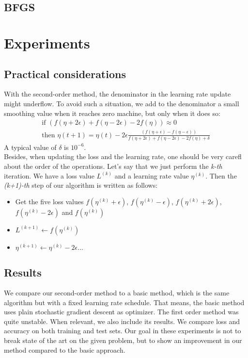 \documentclass{article}
\begin{document}
  
  \subsection{BFGS}
  
  \section{Experiments}
  
  \subsection{Practical considerations}
  
  With the second-order method, the denominator in the learning rate update might underflow. To avoid such a situation, we add to the denominator a small smoothing value when it reaches zero machine, but only when it does so:\\
  \begin{align}
  \text{if } (f(\eta+2\epsilon)+f(\eta-2\epsilon)-2f(\eta)) \approx 0\\
  \text{then }\eta(t+1) = \eta(t) - 2\epsilon\frac{(f(\eta+\epsilon)-f(\eta-\epsilon))}{f(\eta+2\epsilon)+f(\eta-2\epsilon)-2f(\eta)+\delta}
  \end{align}
  A typical value of $\delta$ is $10^{-6}$. \\
  
  Besides, when updating the loss and the learning rate, one should be very carefl about the order of the operations. Let's say that we just perform the \emph{k-th} iteration. We have a loss value $L^{(k)}$ and a learning rate value $\eta^{(k)}$. Then the \emph{(k+1)-th} step of our algorithm is written as follows:\\
  \begin{itemize}
  	\item Get the five loss values $f(\eta^{(k)}+\epsilon)$, $f(\eta^{(k)}-\epsilon)$, $f(\eta^{(k)}+2\epsilon)$, $f(\eta^{(k)}-2\epsilon)$ and $f(\eta^{(k)})$
  	\item $L^{(k+1)} \leftarrow f(\eta^{(k)})$
  	\item $\eta^{(k+1)} \leftarrow \eta^{(k)} -2\epsilon...$
  \end{itemize}
  
  \subsection{Results} 
  
  We compare our second-order method to a basic method, which is the same algorithm but with a fixed learning rate schedule. That means, the basic method uses plain stochastic gradient descent as optimizer. The first order method was quite unstable. When relevant, we also include its results. We compare loss and accuracy on both training and test sets. Our goal in these experiments is not to break state of the art on the given problem, but to show an improvement in our method compared to the basic approach. 
 
\end{document}
